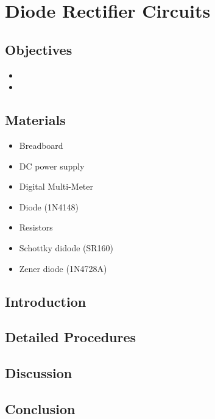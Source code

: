 \chapter{Diode Rectifier Circuits}


\section{Objectives}
\begin{itemize}
    \item 
    \item 
\end{itemize}

\section{Materials}
\begin{itemize}
    \item Breadboard
    \item DC power supply
    \item Digital Multi-Meter
    \item Diode (1N4148)
    \item Resistors
    \item Schottky didode (SR160)
    \item Zener diode (1N4728A)
\end{itemize}

\section{Introduction}


\section{Detailed Procedures}


\section{Discussion}


\section{Conclusion}
